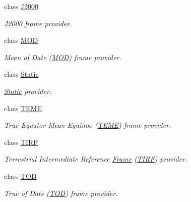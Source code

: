 \begin{DoxyCompactItemize}
class \hyperlink{classostk_1_1physics_1_1coord_1_1frame_1_1provider_1_1_j2000}{J2000}
\begin{DoxyCompactList}\small\item\em \hyperlink{classostk_1_1physics_1_1coord_1_1frame_1_1provider_1_1_j2000}{J2000} frame provider. \end{DoxyCompactList}\item 
class \hyperlink{classostk_1_1physics_1_1coord_1_1frame_1_1provider_1_1_m_o_d}{M\+OD}
\begin{DoxyCompactList}\small\item\em Mean of Date (\hyperlink{classostk_1_1physics_1_1coord_1_1frame_1_1provider_1_1_m_o_d}{M\+OD}) frame provider. \end{DoxyCompactList}\item 
class \hyperlink{classostk_1_1physics_1_1coord_1_1frame_1_1provider_1_1_static}{Static}
\begin{DoxyCompactList}\small\item\em \hyperlink{classostk_1_1physics_1_1coord_1_1frame_1_1provider_1_1_static}{Static} provider. \end{DoxyCompactList}\item 
class \hyperlink{classostk_1_1physics_1_1coord_1_1frame_1_1provider_1_1_t_e_m_e}{T\+E\+ME}
\begin{DoxyCompactList}\small\item\em True Equator Mean Equinox (\hyperlink{classostk_1_1physics_1_1coord_1_1frame_1_1provider_1_1_t_e_m_e}{T\+E\+ME}) frame provider. \end{DoxyCompactList}\item 
class \hyperlink{classostk_1_1physics_1_1coord_1_1frame_1_1provider_1_1_t_i_r_f}{T\+I\+RF}
\begin{DoxyCompactList}\small\item\em Terrestrial Intermediate Reference \hyperlink{classostk_1_1physics_1_1coord_1_1_frame}{Frame} (\hyperlink{classostk_1_1physics_1_1coord_1_1frame_1_1provider_1_1_t_i_r_f}{T\+I\+RF}) provider. \end{DoxyCompactList}\item 
class \hyperlink{classostk_1_1physics_1_1coord_1_1frame_1_1provider_1_1_t_o_d}{T\+OD}
\begin{DoxyCompactList}\small\item\em True of Date (\hyperlink{classostk_1_1physics_1_1coord_1_1frame_1_1provider_1_1_t_o_d}{T\+OD}) frame provider. \end{DoxyCompactList}\end{DoxyCompactItemize}
